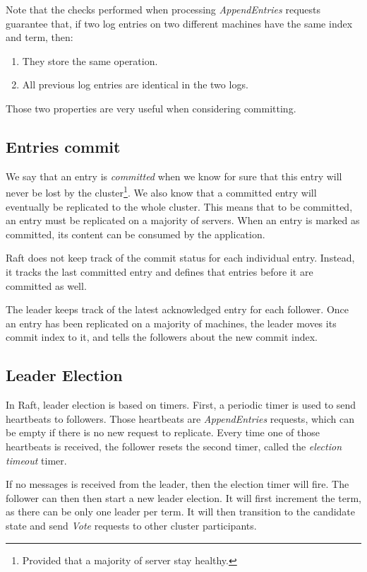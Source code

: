 Note that the checks performed when processing \emph{AppendEntries} requests guarantee that, if two log entries on two different machines have the same index and term, then:

\begin{enumerate}
    \item They store the same operation.
    \item All previous log entries are identical in the two logs.
\end{enumerate}

Those two properties are very useful when considering committing.

\subsection{Entries commit}

We say that an entry is \emph{committed} when we know for sure that this entry will never be lost by the cluster\footnote{Provided that a majority of server stay healthy.}.
We also know that a committed entry will eventually be replicated to the whole cluster.
This means that to be committed, an entry must be replicated on a majority of servers.
When an entry is marked as committed, its content can be consumed by the application.

Raft does not keep track of the commit status for each individual entry.
Instead, it tracks the last committed entry and defines that entries before it are committed as well.

The leader keeps track of the latest acknowledged entry for each follower.
Once an entry has been replicated on a majority of machines, the leader moves its commit index to it, and tells the followers about the new commit index.


\subsection{Leader Election}

In Raft, leader election is based on timers.
First, a periodic timer is used to send heartbeats to followers.
Those heartbeats are \emph{AppendEntries} requests, which can be empty if there is no new request to replicate.
Every time one of those heartbeats is received, the follower resets the second timer, called the \emph{election timeout} timer.

If no messages is received from the leader, then the election timer will fire.
The follower can then then start a new leader election.
It will first increment the term, as there can be only one leader per term.
It will then transition to the candidate state and send \emph{Vote} requests to other cluster participants.

